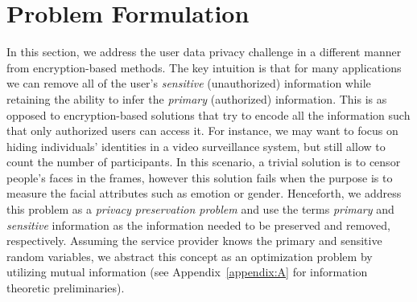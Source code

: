 \documentclass[10pt,journal,compsoc]{IEEEtran}
\begin{document}
\section{Problem Formulation}\label{sec:opt}%
In this section, we address the user data privacy challenge in a different manner from encryption-based methods. The key intuition is that for many applications we can remove all of the user's \emph{sensitive} (unauthorized) information while retaining the ability to infer the \emph{primary} (authorized) information. This is as opposed to encryption-based solutions that try to encode all the information such that only authorized users can access it. For instance, we may want to focus on hiding individuals' identities in a video surveillance system, but still allow to count the number of participants. In this scenario, a trivial solution is to censor people's faces in the frames, however this solution fails when the purpose is to measure the facial attributes such as emotion or gender. Henceforth, we address this problem as a \emph{privacy preservation problem} and use the terms \emph{primary} and \emph{sensitive} information as the information needed to be preserved and removed, respectively. Assuming the service provider knows the primary and sensitive random variables, we abstract this concept as an optimization problem by utilizing mutual information (see Appendix~\ref{appendix:A} for information theoretic preliminaries). 
\end{document}
